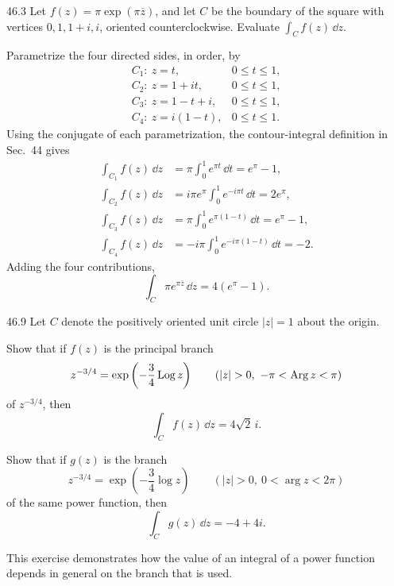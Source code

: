 \documentclass[11pt,oneside]{article}
\begin{document}
\begin{exercise}{46.3}
Let \(f(z)=\pi\exp(\pi\overline z)\), and let \(C\) be the boundary of the square with vertices \(0, 1, 1+i, i\), oriented counterclockwise. Evaluate \(\int_C f(z)\,\dd z\).
\end{exercise}

\begin{solution}
Parametrize the four directed sides, in order, by
\[
\begin{array}{ll}
    C_1:\ z=t, & 0\le t\le1, \\
    C_2:\ z=1+it, & 0\le t\le1, \\
    C_3:\ z=1-t+i, & 0\le t\le1, \\
    C_4:\ z=i(1-t), & 0\le t\le1.
\end{array}
\]
Using the conjugate of each parametrization, the contour-integral definition in Sec.~44 gives
\[
\begin{aligned}
    \int_{C_1}f(z)\,\dd z
        &=\pi\int_0^1e^{\pi t}\,\dd t=e^\pi-1, \\
    \int_{C_2}f(z)\,\dd z
        &=i\pi e^\pi\int_0^1e^{-i\pi t}\,\dd t=2e^\pi, \\
    \int_{C_3}f(z)\,\dd z
        &=\pi\int_0^1e^{\pi(1-t)}\,\dd t=e^\pi-1, \\
    \int_{C_4}f(z)\,\dd z
        &=-i\pi\int_0^1e^{-i\pi(1-t)}\,\dd t=-2.
\end{aligned}
\]
Adding the four contributions,
\[
    \boxed{\int_C\pi e^{\pi\overline z}\,\dd z=4(e^\pi-1)}.
\]
\end{solution}

\begin{exercise}{46.9}
Let \(C\) denote the positively oriented unit circle \(|z|=1\) about the origin.
\begin{exercisesubparts}
    \item Show that if \(f(z)\) is the principal branch
    \[
        z^{-3/4}=\exp\left(-\frac34\Log z\right)
        \qquad(|z|>0, \ -\pi<\Arg z<\pi)
    \]
    of \(z^{-3/4}\), then
    \[
        \int_Cf(z)\,\dd z=4\sqrt2\,i.
    \]
    \item Show that if \(g(z)\) is the branch
    \[
        z^{-3/4}=\exp\left(-\frac34\log z\right)
        \qquad(|z|>0, \ 0<\arg z<2\pi)
    \]
    of the same power function, then
    \[
        \int_Cg(z)\,\dd z=-4+4i.
    \]
\end{exercisesubparts}
This exercise demonstrates how the value of an integral of a power function depends in general on the branch that is used.
\end{exercise}
\end{document}

